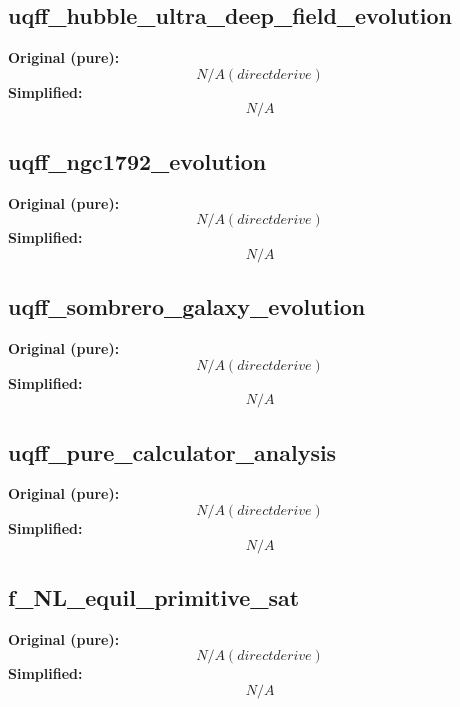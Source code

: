\subsection{uqff_hubble_ultra_deep_field_evolution}
\textbf{Original (pure):}
\begin{equation}
N/A (direct derive)
\end{equation}
\textbf{Simplified:}
\begin{equation}
N/A
\end{equation}

\subsection{uqff_ngc1792_evolution}
\textbf{Original (pure):}
\begin{equation}
N/A (direct derive)
\end{equation}
\textbf{Simplified:}
\begin{equation}
N/A
\end{equation}

\subsection{uqff_sombrero_galaxy_evolution}
\textbf{Original (pure):}
\begin{equation}
N/A (direct derive)
\end{equation}
\textbf{Simplified:}
\begin{equation}
N/A
\end{equation}

\subsection{uqff_pure_calculator_analysis}
\textbf{Original (pure):}
\begin{equation}
N/A (direct derive)
\end{equation}
\textbf{Simplified:}
\begin{equation}
N/A
\end{equation}

\subsection{f_NL_equil_primitive_sat}
\textbf{Original (pure):}
\begin{equation}
N/A (direct derive)
\end{equation}
\textbf{Simplified:}
\begin{equation}
N/A
\end{equation}

